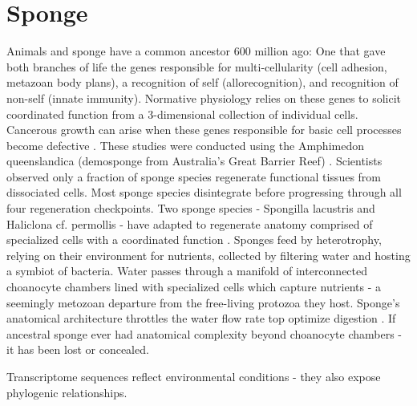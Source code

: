 \documentclass[a4paper, 11pt]{article}
\begin{document}
   \section{Sponge}
Animals and sponge have a common ancestor 600 million ago: One that gave both branches of life the genes responsible for multi-cellularity (cell adhesion, metazoan body plans), a recognition of self (allorecognition), and recognition of non-self (innate immunity). Normative physiology relies on these genes to solicit coordinated function from a 3-dimensional collection of individual cells. Cancerous growth can arise when these genes responsible for basic cell processes become defective \cite{srivastava2010amphimedon}. These studies were conducted using the Amphimedon queenslandica (demosponge from Australia's Great Barrier Reef) \cite{srivastava2010amphimedon}. 
Scientists observed only a fraction of sponge species regenerate functional tissues from dissociated cells. Most sponge species disintegrate before progressing through all four regeneration checkpoints. Two sponge species - Spongilla lacustris and Haliclona cf. permollis - have adapted to regenerate anatomy comprised of specialized cells with a coordinated function \cite{eerkes2015sponge}. 
Sponges feed by heterotrophy, relying on their environment for nutrients, collected by filtering water and hosting a symbiot of bacteria. Water passes through a manifold of interconnected choanocyte chambers lined with specialized cells which capture nutrients - a seemingly metozoan departure from the free-living protozoa they host.  Sponge's anatomical architecture throttles the water flow rate top optimize digestion \cite{riesgo2014analysis}.
If ancestral sponge ever had anatomical complexity beyond choanocyte chambers - it has been lost or concealed. 
 
Transcriptome sequences reflect environmental conditions - they also expose phylogenic relationships. 
\end{document}
